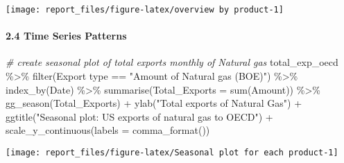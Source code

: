 \documentclass[
]{article}
\newenvironment{Shaded}{\begin{snugshade}}{\end{snugshade}}
\newcommand{\AttributeTok}[1]{\textcolor[rgb]{0.77,0.63,0.00}{#1}}
\newcommand{\CommentTok}[1]{\textcolor[rgb]{0.56,0.35,0.01}{\textit{#1}}}
\newcommand{\FunctionTok}[1]{\textcolor[rgb]{0.00,0.00,0.00}{#1}}
\newcommand{\NormalTok}[1]{#1}
\newcommand{\SpecialCharTok}[1]{\textcolor[rgb]{0.00,0.00,0.00}{#1}}
\newcommand{\StringTok}[1]{\textcolor[rgb]{0.31,0.60,0.02}{#1}}
\begin{document}
\begin{center}\texttt{[image: report\_files/figure-latex/overview by product-1]} \end{center}

\hypertarget{time-series-patterns}{%
\paragraph{2.4 Time Series Patterns}\label{time-series-patterns}}

\begin{Shaded}
\begin{Highlighting}[]
\CommentTok{\# create seasonal plot of total exports monthly of Natural gas}
\NormalTok{total\_exp\_oecd }\SpecialCharTok{\%\textgreater{}\%} \FunctionTok{filter}\NormalTok{(}\StringTok{\textasciigrave{}}\AttributeTok{Export type}\StringTok{\textasciigrave{}} \SpecialCharTok{==} \StringTok{"Amount of Natural gas (BOE)"}\NormalTok{) }\SpecialCharTok{\%\textgreater{}\%} 
  \FunctionTok{index\_by}\NormalTok{(Date) }\SpecialCharTok{\%\textgreater{}\%} 
  \FunctionTok{summarise}\NormalTok{(}\AttributeTok{Total\_Exports =} \FunctionTok{sum}\NormalTok{(}\StringTok{\textasciigrave{}}\AttributeTok{Amount}\StringTok{\textasciigrave{}}\NormalTok{)) }\SpecialCharTok{\%\textgreater{}\%} 
  \FunctionTok{gg\_season}\NormalTok{(Total\_Exports) }\SpecialCharTok{+}
  \FunctionTok{ylab}\NormalTok{(}\StringTok{"Total exports  of Natural Gas"}\NormalTok{) }\SpecialCharTok{+}
  \FunctionTok{ggtitle}\NormalTok{(}\StringTok{"Seasonal plot: US exports of natural gas to OECD"}\NormalTok{) }\SpecialCharTok{+}
  \FunctionTok{scale\_y\_continuous}\NormalTok{(}\AttributeTok{labels =} \FunctionTok{comma\_format}\NormalTok{())}
\end{Highlighting}
\end{Shaded}

\begin{center}\texttt{[image: report\_files/figure-latex/Seasonal plot for each product-1]} \end{center}
\end{document}
